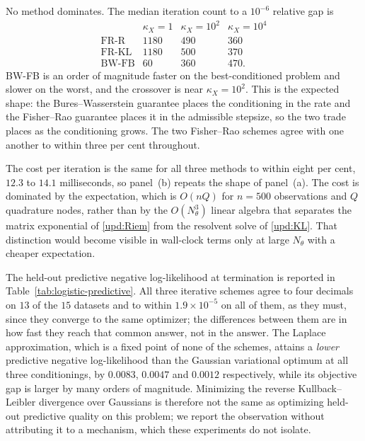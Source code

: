 No method dominates. The median iteration count to a $10^{-6}$ relative gap is
\[
\begin{array}{lccc}
 & \kappa_X=1 & \kappa_X=10^2 & \kappa_X=10^4\\
\text{FR-R} & 1180 & 490 & 360\\
\text{FR-KL} & 1180 & 500 & 370\\
\text{BW-FB} & 60 & 360 & 470.
\end{array}
\]
BW-FB is an order of magnitude faster on the best-conditioned problem and slower
on the worst, and the crossover is near $\kappa_X=10^2$. This is the expected
shape: the Bures--Wasserstein guarantee places the conditioning in the rate and
the Fisher--Rao guarantee places it in the admissible stepsize, so the two trade
places as the conditioning grows. The two Fisher--Rao schemes agree with one
another to within three per cent throughout.

The cost per iteration is the same for all three methods to within eight per
cent, $12.3$ to $14.1$ milliseconds, so panel~(b) repeats the shape of panel~(a).
The cost is dominated by the expectation, which is $O(nQ)$ for $n=500$
observations and $Q$ quadrature nodes, rather than by the $O(N_\theta^3)$ linear
algebra that separates the matrix exponential of \eqref{upd:Riem} from the
resolvent solve of \eqref{upd:KL}. That distinction would become visible in
wall-clock terms only at large $N_\theta$ with a cheaper expectation.

The held-out predictive negative log-likelihood at termination is reported in
Table~\ref{tab:logistic-predictive}. All three iterative schemes agree to four
decimals on $13$ of the $15$ datasets and to within $1.9\times10^{-5}$ on all of
them, as they must, since they converge to the same optimizer; the differences between them are in how fast they
reach that common answer, not in the answer. The Laplace approximation, which is
a fixed point of none of the schemes, attains a \emph{lower} predictive negative
log-likelihood than the Gaussian variational optimum at all three conditionings,
by $0.0083$, $0.0047$ and $0.0012$ respectively, while its objective gap is larger
by many orders of magnitude. Minimizing the reverse Kullback--Leibler divergence
over Gaussians is therefore not the same as optimizing held-out predictive
quality on this problem; we report the observation without attributing it to a
mechanism, which these experiments do not isolate.
